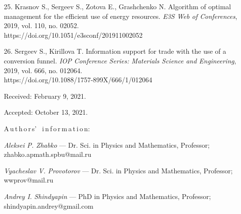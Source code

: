 {25. Krasnov S., Sergeev S., Zotova E., Grashchenko N. Algorithm of optimal management for the efficient use of energy resources. \emph{E3S Web of Conferences}, 2019, vol. 110, no. 02052.\\  https://doi.org/10.1051/e3sconf/201911002052

26. Sergeev S., Kirillova T. Information support for trade with the use of a conversion funnel. \emph{IOP Conference Series: Materials Science and Engineering}, 2019,  vol. 666, no. 012064.\\
https://doi.org/10.1088/1757-899X/666/1/012064



\vskip 1.5mm

%


Received:  February 9, 2021.

Accepted: October 13, 2021.

\vskip 4.5mm%


A\,u\,t\,h\,o\,r\,s' \ i\,n\,f\,o\,r\,m\,a\,t\,i\,o\,n:


\vskip 1.5mm%
 \textit{Aleksei P. Zhabko} --- Dr. Sci. in  Physics and Mathematics, Professor;
zhabko.apmath.spbu@mail.ru \par


\vskip 1.5mm%
 \textit{Vyacheslav V. Provotorov} --- Dr. Sci. in Physics and Mathematics, Professor;  wwprov@mail.ru \par

\vskip 1.5mm%
 \textit{Andrey I. Shindyapin} --- PhD in  Physics and Mathematics, Professor;
shindyapin.andrey@gmail.com
 \par
%
%
}
